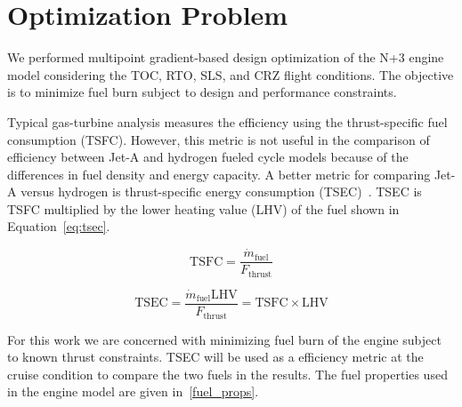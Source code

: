 \documentclass[conf]{new-aiaa}
\begin{document}
\section{Optimization Problem}
\label{sec:optprob}

We performed multipoint gradient-based design optimization of the N+3 engine model considering the TOC, RTO, SLS, and CRZ flight conditions.
The objective is to minimize fuel burn subject to design and performance constraints.

Typical gas-turbine analysis measures the efficiency using the thrust-specific fuel consumption (TSFC).
However, this metric is not useful in the comparison of efficiency between Jet-A and hydrogen fueled cycle models because of the differences in fuel density and energy capacity.
A better metric for comparing Jet-A versus hydrogen is thrust-specific energy consumption (TSEC)~\cite{Adler2023}.
TSEC is TSFC multiplied by the lower heating value (LHV) of the fuel shown in Equation~\eqref{eq:tsec}.

\begin{equation}
  \mathrm{TSFC} = \frac{\dot{m}_{\mathrm{fuel}}}{F_{\mathrm{thrust}}}
  \label{eq:tsfc}
\end{equation}

\begin{equation}
  \mathrm{TSEC} = \frac{\dot{m}_{\mathrm{fuel}} \mathrm{LHV}}{F_{\mathrm{thrust}}} = \mathrm{TSFC} \times \mathrm{LHV}
  \label{eq:tsec}
\end{equation}

For this work we are concerned with minimizing fuel burn of the engine subject to known thrust constraints.
TSEC will be used as a efficiency metric at the cruise condition to compare the two fuels in the results.
The fuel properties used in the engine model are given in~\ref{fuel_props}.
\end{document}
